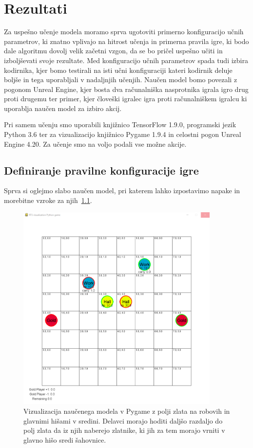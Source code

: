 \documentclass[a4paper, 12pt]{book}
\begin{document}
\chapter{Rezultati}
\label{chrezultati}

Za uspešno učenje modela moramo sprva ugotoviti primerno konfiguracijo učnih parametrov, ki znatno vplivajo na hitrost učenja in primerna pravila igre, ki bodo dale algoritmu dovolj velik začetni vzgon, da se bo pričel uspešno učiti in izboljševati svoje rezultate.
Med konfiguracijo učnih parametrov spada tudi izbira kodirnika, kjer bomo testirali na isti učni konfiguraciji kateri kodirnik deluje boljše in tega uporabljali v nadaljnjih učenjih.
Naučen model bomo povezali z pogonom Unreal Engine, kjer bosta dva računalniška nasprotnika igrala igro drug proti drugemu ter primer, kjer človeški igralec igra proti računalniškem igralcu ki uporablja naučen model za izbiro akcij.

Pri samem učenju smo uporabili knjižnico TensorFlow 1.9.0, programski jezik Python 3.6 ter za vizualizacijo knjižnico Pygame 1.9.4 in celostni pogon Unreal Engine 4.20.
Za učenje smo na voljo podali vse možne akcije.
\section{Definiranje pravilne konfiguracije igre}

Sprva si oglejmo slabo naučen model, pri katerem lahko izpostavimo napake in morebitne vzroke za njih~\ref{vizualizacijaRezultatovSpremembaZlata}.
\begin{figure}[h]
	\begin{center}
		\includegraphics[width=0.9\textwidth]{photos/third-2018-11-14.pdf}
	\end{center}
	\caption{Vizualizacija naučenega modela v Pygame z polji zlata na robovih in glavnimi hišami v sredini. Delavci morajo hoditi daljšo razdaljo do polj zlata da iz njih naberejo zlatnike, ki jih za tem morajo vrniti v glavno hišo sredi šahovnice. }
	\label{vizualizacijaRezultatovSpremembaZlata}
\end{figure}
\end{document}
